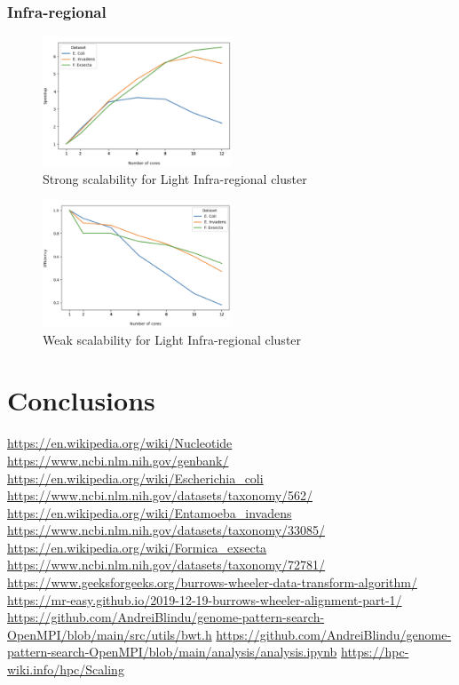\documentclass[final,5p,times,twocolumn,authoryear]{elsarticle}
\begin{document}
\subsubsection{Infra-regional}
\begin{figure}
    \centering
    \includegraphics[width=0.5\textwidth]{images/light_infra_strong.png}
    \caption{Strong scalability for Light Infra-regional cluster }
    \label{fig:light-infra-strong}
\end{figure}
\begin{figure}
    \centering
    \includegraphics[width=0.5\textwidth]{images/light_infra_weak.png}
    \caption{Weak scalability for Light Infra-regional cluster }
    \label{fig:light-infra-weak}
\end{figure}

\section{Conclusions}

\begin{thebibliography}{9}
 \url{https://en.wikipedia.org/wiki/Nucleotide}
 \url{https://www.ncbi.nlm.nih.gov/genbank/}
 \url{https://en.wikipedia.org/wiki/Escherichia_coli}
 \url{https://www.ncbi.nlm.nih.gov/datasets/taxonomy/562/}
 \url{https://en.wikipedia.org/wiki/Entamoeba_invadens}
 \url{https://www.ncbi.nlm.nih.gov/datasets/taxonomy/33085/}
 \url{https://en.wikipedia.org/wiki/Formica_exsecta}
 \url{https://www.ncbi.nlm.nih.gov/datasets/taxonomy/72781/}
\url{https://www.geeksforgeeks.org/burrows-wheeler-data-transform-algorithm/}
\url{https://mr-easy.github.io/2019-12-19-burrows-wheeler-alignment-part-1/}
\url{https://github.com/AndreiBlindu/genome-pattern-search-OpenMPI/blob/main/src/utils/bwt.h}
\url{https://github.com/AndreiBlindu/genome-pattern-search-OpenMPI/blob/main/analysis/analysis.ipynb}
\url{https://hpc-wiki.info/hpc/Scaling}
\end{thebibliography}
\end{document}

